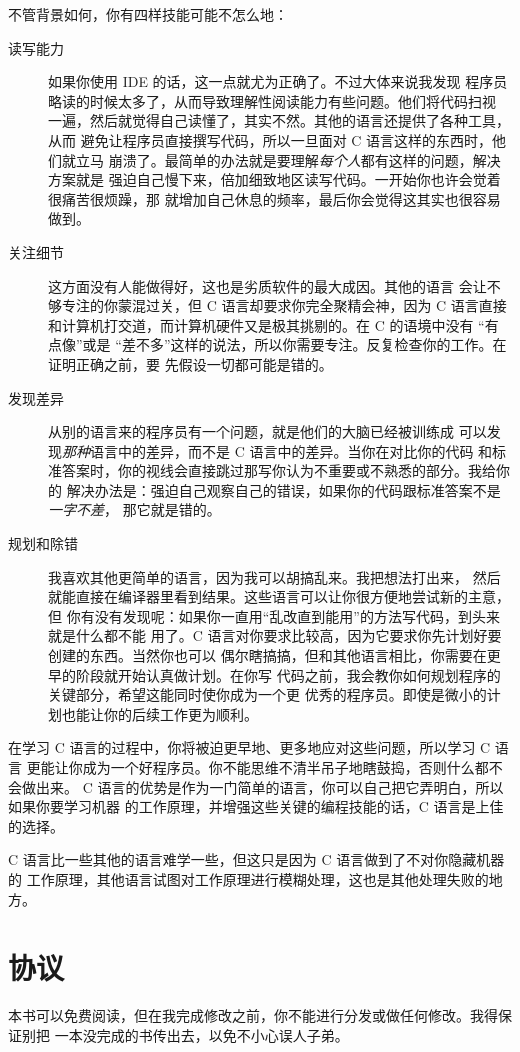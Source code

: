 不管背景如何，你有四样技能可能不怎么地：

\begin{description}

\item[读写能力] 如果你使用 IDE 的话，这一点就尤为正确了。不过大体来说我发现
    程序员略读的时候太多了，从而导致理解性阅读能力有些问题。他们将代码扫视
    一遍，然后就觉得自己读懂了，其实不然。其他的语言还提供了各种工具，从而
    避免让程序员直接撰写代码，所以一旦面对 C 语言这样的东西时，他们就立马
    崩溃了。最简单的办法就是要理解\emph{每个人}都有这样的问题，解决方案就是
    强迫自己慢下来，倍加细致地区读写代码。一开始你也许会觉着很痛苦很烦躁，那
    就增加自己休息的频率，最后你会觉得这其实也很容易做到。

\item[关注细节] 这方面没有人能做得好，这也是劣质软件的最大成因。其他的语言
    会让不够专注的你蒙混过关，但 C 语言却要求你完全聚精会神，因为 C 语言直接
    和计算机打交道，而计算机硬件又是极其挑剔的。在 C 的语境中没有 “有点像”或是
    “差不多”这样的说法，所以你需要专注。反复检查你的工作。在证明正确之前，要
    先假设一切都可能是错的。
    
\item[发现差异] 从别的语言来的程序员有一个问题，就是他们的大脑已经被训练成
    可以发现\emph{那种}语言中的差异，而不是 C 语言中的差异。当你在对比你的代码
    和标准答案时，你的视线会直接跳过那写你认为不重要或不熟悉的部分。我给你的
    解决办法是：强迫自己观察自己的错误，如果你的代码跟标准答案不是\emph{一字不差}，
    那它就是错的。
\item[规划和除错]  我喜欢其他更简单的语言，因为我可以胡搞乱来。我把想法打出来，
    然后就能直接在编译器里看到结果。这些语言可以让你很方便地尝试新的主意，但
    你有没有发现呢：如果你一直用“乱改直到能用”的方法写代码，到头来就是什么都不能
    用了。C 语言对你要求比较高，因为它要求你先计划好要创建的东西。当然你也可以
    偶尔瞎搞搞，但和其他语言相比，你需要在更早的阶段就开始认真做计划。在你写
    代码之前，我会教你如何规划程序的关键部分，希望这能同时使你成为一个更
    优秀的程序员。即使是微小的计划也能让你的后续工作更为顺利。
\end{description}

在学习 C 语言的过程中，你将被迫更早地、更多地应对这些问题，所以学习 C 语言
更能让你成为一个好程序员。你不能思维不清半吊子地瞎鼓捣，否则什么都不会做出来。
C 语言的优势是作为一门简单的语言，你可以自己把它弄明白，所以如果你要学习机器
的工作原理，并增强这些关键的编程技能的话，C 语言是上佳的选择。

C 语言比一些其他的语言难学一些，但这只是因为 C 语言做到了不对你隐藏机器的
工作原理，其他语言试图对工作原理进行模糊处理，这也是其他处理失败的地方。

\section*{协议}

本书可以免费阅读，但在我完成修改之前，你不能进行分发或做任何修改。我得保证别把
一本没完成的书传出去，以免不小心误人子弟。

